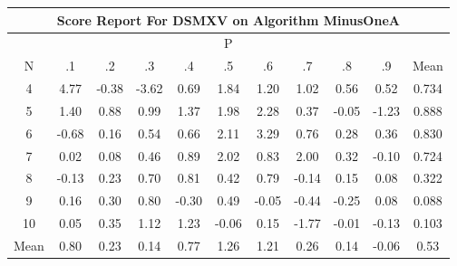 \documentclass[11pt,a4paper]{report}
\begin{document}
\begin{longtable}{ | c || c | c | c | c | c | c | c | c | c || c |}
\hline
\multicolumn{11}{|c|}{ Score Report For DSMXV on Algorithm MinusOneA} \\
\hline
\multicolumn{11}{|c|}{ P } \\
\hline
N & .1 & .2 & .3 & .4 & .5 & .6 & .7 & .8 & .9 & Mean\\
 \hline
 \hline
 \endhead
  4 &  \cellcolor[HTML]{8787FF} 4.77 &  \cellcolor[HTML]{FFF7F7} -0.38 &  \cellcolor[HTML]{FFA7A7} -3.62 &  \cellcolor[HTML]{EFEFFF} 0.69 &  \cellcolor[HTML]{CFCFFF} 1.84 &  \cellcolor[HTML]{DFDFFF} 1.20 &  \cellcolor[HTML]{E7E7FF} 1.02 &  \cellcolor[HTML]{EFEFFF} 0.56 &  \cellcolor[HTML]{EFEFFF} 0.52 & 0.734 \\
  5 &  \cellcolor[HTML]{DFDFFF} 1.40 &  \cellcolor[HTML]{E7E7FF} 0.88 &  \cellcolor[HTML]{E7E7FF} 0.99 &  \cellcolor[HTML]{DFDFFF} 1.37 &  \cellcolor[HTML]{CFCFFF} 1.98 &  \cellcolor[HTML]{C7C7FF} 2.28 &  \cellcolor[HTML]{F7F7FF} 0.37 &  \cellcolor[HTML]{FFFFFF} -0.05 &  \cellcolor[HTML]{FFDFDF} -1.23 & 0.888 \\
  6 &  \cellcolor[HTML]{FFEFEF} -0.68 &  \cellcolor[HTML]{FFFFFF} 0.16 &  \cellcolor[HTML]{EFEFFF} 0.54 &  \cellcolor[HTML]{EFEFFF} 0.66 &  \cellcolor[HTML]{C7C7FF} 2.11 &  \cellcolor[HTML]{AFAFFF} 3.29 &  \cellcolor[HTML]{EFEFFF} 0.76 &  \cellcolor[HTML]{F7F7FF} 0.28 &  \cellcolor[HTML]{F7F7FF} 0.36 & 0.830 \\
  7 &  \cellcolor[HTML]{FFFFFF} 0.02 &  \cellcolor[HTML]{FFFFFF} 0.08 &  \cellcolor[HTML]{F7F7FF} 0.46 &  \cellcolor[HTML]{E7E7FF} 0.89 &  \cellcolor[HTML]{CFCFFF} 2.02 &  \cellcolor[HTML]{E7E7FF} 0.83 &  \cellcolor[HTML]{CFCFFF} 2.00 &  \cellcolor[HTML]{F7F7FF} 0.32 &  \cellcolor[HTML]{FFFFFF} -0.10 & 0.724 \\
  8 &  \cellcolor[HTML]{FFFFFF} -0.13 &  \cellcolor[HTML]{F7F7FF} 0.23 &  \cellcolor[HTML]{EFEFFF} 0.70 &  \cellcolor[HTML]{E7E7FF} 0.81 &  \cellcolor[HTML]{F7F7FF} 0.42 &  \cellcolor[HTML]{EFEFFF} 0.79 &  \cellcolor[HTML]{FFFFFF} -0.14 &  \cellcolor[HTML]{FFFFFF} 0.15 &  \cellcolor[HTML]{FFFFFF} 0.08 & 0.322 \\
  9 &  \cellcolor[HTML]{F7F7FF} 0.16 &  \cellcolor[HTML]{F7F7FF} 0.30 &  \cellcolor[HTML]{E7E7FF} 0.80 &  \cellcolor[HTML]{FFF7F7} -0.30 &  \cellcolor[HTML]{EFEFFF} 0.49 &  \cellcolor[HTML]{FFFFFF} -0.05 &  \cellcolor[HTML]{FFF7F7} -0.44 &  \cellcolor[HTML]{FFF7F7} -0.25 &  \cellcolor[HTML]{FFFFFF} 0.08 & 0.088 \\
  10 &  \cellcolor[HTML]{FFFFFF} 0.05 &  \cellcolor[HTML]{F7F7FF} 0.35 &  \cellcolor[HTML]{DFDFFF} 1.12 &  \cellcolor[HTML]{DFDFFF} 1.23 &  \cellcolor[HTML]{FFFFFF} -0.06 &  \cellcolor[HTML]{FFFFFF} 0.15 &  \cellcolor[HTML]{FFCFCF} -1.77 &  \cellcolor[HTML]{FFFFFF} -0.01 &  \cellcolor[HTML]{FFFFFF} -0.13 & 0.103 \\
 \hline
 \hline
Mean &  \cellcolor[HTML]{E7E7FF} 0.80 &  \cellcolor[HTML]{F7F7FF} 0.23 &  \cellcolor[HTML]{FFFFFF} 0.14 &  \cellcolor[HTML]{EFEFFF} 0.77 &  \cellcolor[HTML]{DFDFFF} 1.26 &  \cellcolor[HTML]{DFDFFF} 1.21 &  \cellcolor[HTML]{F7F7FF} 0.26 &  \cellcolor[HTML]{FFFFFF} 0.14 &  \cellcolor[HTML]{FFFFFF} -0.06 &  \cellcolor[HTML]{EFEFFF} 0.53
\end{longtable}
\end{document}
